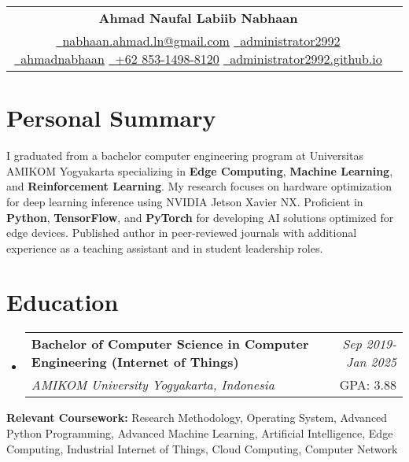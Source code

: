 \documentclass[a4paper,11pt]{article}
\makeatletter
\newcommand{\resumeSubheading}[4]{
\vspace{0.5mm}\item
    \begin{tabular*}{0.98\textwidth}[t]{l@{\extracolsep{\fill}}r}
        \textbf{#1} & \textit{\footnotesize{#4}} \\
        \textit{\footnotesize{#3}} &  \footnotesize{#2}\\
    \end{tabular*}
    \vspace{-2.4mm}
}
\newcommand{\resumeSubHeadingListStart}{\begin{itemize}[leftmargin=*,labelsep=0mm]}
\newcommand{\resumeSubHeadingListEnd}{\end{itemize}\vspace{2mm}}
\newcommand{\name}{Ahmad Naufal Labiib Nabhaan} %
\newcommand{\phone}{+62 853-1498-8120} %
\newcommand{\emaila}{nabhaan.ahmad.ln@gmail.com} %
\newcommand{\myweb}{https://administrator2992.github.io}
\newcommand{\myloc}{Indonesia}
\makeatother
\begin{document}
\selectfont

{
\begin{center}
\begin{tabularx}{\linewidth}{C r} %
  \\
  \textbf{\Huge \name} \\ %
  \href{mailto:\emaila}{\raisebox{0.0\height}{\footnotesize \faEnvelope}\ {\emaila}} \href{https://github.com/administrator2992}{\raisebox{0.0\height}{\footnotesize \faGithub}\ {administrator2992}} \href{https://linkedin.com/in/ahmadnabhaan/}{\raisebox{0.0\height}{\footnotesize \faLinkedin}\ {ahmadnabhaan}} \href{tel:\phone}{\raisebox{0.0\height}{\footnotesize \faPhone}\ {\phone}}
  \href{\myweb}{\raisebox{0.0\height}{\footnotesize \faGlobe}\ {administrator2992.github.io}} \raisebox{0.0\height}{\footnotesize \faMapMarker\ {\myloc}}
\end{tabularx}
\end{center}

}

\section{\textbf{Personal Summary}}
\vspace{2.5mm}
\begin{adjustwidth}{0mm}{0mm}
  \justifying  %
  \setlength{\parindent}{0pt}  %
  \setlength{\parskip}{2pt}    %
  
  I graduated from a bachelor computer engineering program at Universitas AMIKOM Yogyakarta specializing in \textbf{Edge Computing}, \textbf{Machine Learning}, and \textbf{Reinforcement Learning}. My research focuses on hardware optimization for deep learning inference using NVIDIA Jetson Xavier NX. Proficient in \textbf{Python}, \textbf{TensorFlow}, and \textbf{PyTorch} for developing AI solutions optimized for edge devices. Published author in peer-reviewed journals with additional experience as a teaching assistant and in student leadership roles.
  
  \end{adjustwidth}
\vspace{-2.5mm}

\section{\textbf{Education}}
  \resumeSubHeadingListStart
    \resumeSubheading
      {Bachelor of Computer Science in Computer Engineering (Internet of Things)}{GPA: 3.88}
      {AMIKOM University Yogyakarta, Indonesia}{Sep 2019- Jan 2025} 
  \resumeSubHeadingListEnd
  \textbf{Relevant Coursework:}
  Research Methodology, Operating System, Advanced Python Programming, Advanced Machine Learning, Artificial Intelligence, Edge Computing, Industrial Internet of Things, Cloud Computing, Computer Network
\vspace{-2.5mm}
%
\end{document}
